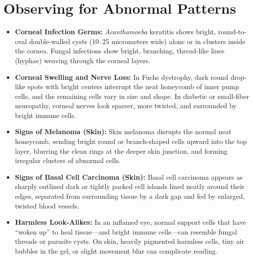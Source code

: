 \section{Observing for Abnormal Patterns}
\begin{itemize}
    \item \textbf{Corneal Infection Germs:} \textit{Acanthamoeba} keratitis shows bright, round-to-oval double-walled cysts (10--25 micrometers wide) alone or in clusters inside the cornea. Fungal infections show bright, branching, thread-like lines (hyphae) weaving through the corneal layers.
    \item \textbf{Corneal Swelling and Nerve Loss:} In Fuchs dystrophy, dark round drop-like spots with bright centers interrupt the neat honeycomb of inner pump cells, and the remaining cells vary in size and shape. In diabetic or small-fiber neuropathy, corneal nerves look sparser, more twisted, and surrounded by bright immune cells.
    \item \textbf{Signs of Melanoma (Skin):} Skin melanoma disrupts the normal neat honeycomb, sending bright round or branch-shaped cells upward into the top layer, blurring the clean rings at the deeper skin junction, and forming irregular clusters of abnormal cells.
    \item \textbf{Signs of Basal Cell Carcinoma (Skin):} Basal cell carcinoma appears as sharply outlined dark or tightly packed cell islands lined neatly around their edges, separated from surrounding tissue by a dark gap and fed by enlarged, twisted blood vessels.
    \item \textbf{Harmless Look-Alikes:} In an inflamed eye, normal support cells that have ``woken up'' to heal tissue---and bright immune cells---can resemble fungal threads or parasite cysts. On skin, heavily pigmented harmless cells, tiny air bubbles in the gel, or slight movement blur can complicate reading.
\end{itemize}

